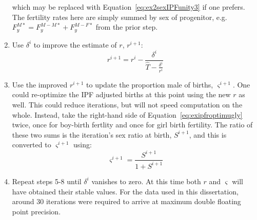 \begin{enumerate}
  which may be replaced with Equation~\eqref{eq:ex2sexIPFunity3} if one
  prefers. The fertility rates here are simply summed by sex of progenitor, e.g.
  $F_{y}^{M\ast} = F_{y}^{M-M\ast}+F_{y}^{M-F\ast}$ from the prior step.
  \item Use $\delta^i$ to improve the estimate of $r$, $r^{i+1}$:
  \begin{equation}
  r^{i+1} = r^i - \frac{\delta^i}{\widehat{T} - \frac{\delta^i}{r^i}}
  \end{equation}
  \item Use the improved $r^{i+1}$ to update the proportion male of
  births, $\varsigma^{i+1}$. One could re-optimize the IPF adjusted births at
  this point using the new $r$ as well. This could reduce iterations, but will
  not speed computation on the whole. Instead, take the right-hand side of
  Equation~\eqref{eq:exipfroptimugly} twice, once for boy-birth fertlity and
  once for girl birth fertility. The ratio of these two sums is the iteration's
  sex ratio at birth, $S^{i+1}$, and this is converted to $\varsigma^{i+1}$
  using:
  \begin{equation}
  \varsigma^{i+1} = \frac{S^{i+1}}{1 + S^{i+1}}
  \end{equation}
  \item Repeat steps 5-8 until $\delta^i$ vanishes to zero. At this time both
  $r$ and $\varsigma$ will have obtained their stable values. For the data used
  in this dissertation, around 30 iterations were required to arrive at maximum
  double floating point precision.
\end{enumerate}

